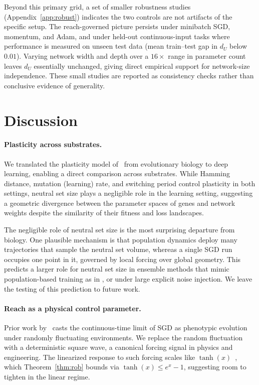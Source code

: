 \documentclass[pmlr]{jmlr} %
\begin{document}
Beyond this primary grid, a set of smaller robustness studies (Appendix~\ref{app:robust}) indicates the two controls are not artifacts of the specific setup. The reach-governed picture persists under minibatch SGD, momentum, and Adam, and under held-out continuous-input tasks where performance is measured on unseen test data (mean train--test gap in $d_U$ below $0.01$). Varying network width and depth over a $16\times$ range in parameter count leaves $d_U$ essentially unchanged, giving direct empirical support for network-size independence. These small studies are reported as consistency checks rather than conclusive evidence of generality.

\section{Discussion}

\paragraph{Plasticity across substrates.} We translated the plasticity model of~\citet{PlasticGP} from evolutionary biology to deep learning, enabling a direct comparison across substrates. While Hamming distance, mutation (learning) rate, and switching period control plasticity in both settings, neutral set size plays a negligible role in the learning setting, suggesting a geometric divergence between the parameter spaces of genes and network weights despite the similarity of their fitness and loss landscapes.

The negligible role of neutral set size is the most surprising departure from biology. One plausible mechanism is that population dynamics deploy many trajectories that sample the neutral set volume, whereas a single SGD run occupies one point in it, governed by local forcing over global geometry. This predicts a larger role for neutral set size in ensemble methods that mimic population-based training as in \citet{ensembles20}, or under large explicit noise injection. We leave the testing of this prediction to future work.

\paragraph{Reach as a physical control parameter.} Prior work by~\citet{latz2021} casts the continuous-time limit of SGD as phenotypic evolution under randomly fluctuating environments. We replace the random fluctuation with a deterministic square wave, a canonical forcing signal in physics and engineering. The linearized response to such forcing scales like $\tanh(x)$~\citep{amplituderesp25}, which Theorem~\ref{thm:rob} bounds via $\tanh(x) \leq e^x - 1$, suggesting room to tighten in the linear regime.
\end{document}
